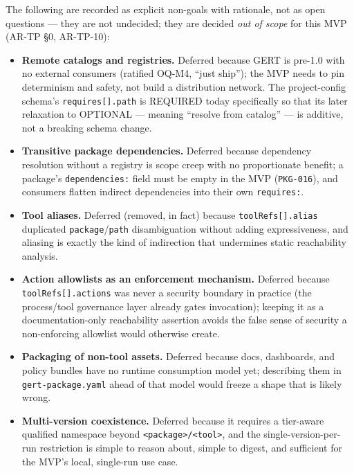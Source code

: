 The following are recorded as explicit non-goals with rationale, not as open questions --- they are
not undecided; they are decided \emph{out of scope} for this MVP (AR-TP §0, AR-TP-10):

\begin{itemize}
  \item \textbf{Remote catalogs and registries.} Deferred because GERT is pre-1.0 with no external
        consumers (ratified OQ-M4, ``just ship''); the MVP needs to pin determinism and safety, not
        build a distribution network. The project-config schema's \texttt{requires[].path} is
        REQUIRED today specifically so that its later relaxation to OPTIONAL --- meaning ``resolve
        from catalog'' --- is additive, not a breaking schema change.
  \item \textbf{Transitive package dependencies.} Deferred because dependency resolution without a
        registry is scope creep with no proportionate benefit; a package's \texttt{dependencies:}
        field must be empty in the MVP (\texttt{PKG-016}), and consumers flatten indirect
        dependencies into their own \texttt{requires:}.
  \item \textbf{Tool aliases.} Deferred (removed, in fact) because \texttt{toolRefs[].alias}
        duplicated \texttt{package}/\texttt{path} disambiguation without adding expressiveness, and
        aliasing is exactly the kind of indirection that undermines static reachability analysis.
  \item \textbf{Action allowlists as an enforcement mechanism.} Deferred because
        \texttt{toolRefs[].actions} was never a security boundary in practice (the process/tool
        governance layer already gates invocation); keeping it as a documentation-only reachability
        assertion avoids the false sense of security a non-enforcing allowlist would otherwise
        create.
  \item \textbf{Packaging of non-tool assets.} Deferred because docs, dashboards, and policy bundles
        have no runtime consumption model yet; describing them in \texttt{gert-package.yaml} ahead
        of that model would freeze a shape that is likely wrong.
  \item \textbf{Multi-version coexistence.} Deferred because it requires a tier-aware qualified
        namespace beyond \texttt{<package>/<tool>}, and the single-version-per-run restriction is
        simple to reason about, simple to digest, and sufficient for the MVP's local, single-run
        use case.
\end{itemize}
